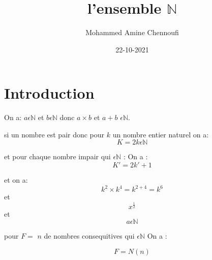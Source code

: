 \documentclass[14pt]{extarticle}
\title{l'ensemble $\mathbb{N}$}
\date{22-10-2021}
\author{Mohammed Amine Chennoufi}
\begin{document}
\maketitle
\newpage
{}
\section{Introduction}
On a: $ a {\epsilon} {\mathbb{N}}$ et $b \epsilon {\mathbb{N}}$
donc $ a \times b $ et $ a+b$ $ \epsilon {\mathbb{N}}$.


si un nombre est pair donc pour $k$ un nombre entier naturel on a: 
$$K=2k \epsilon \mathbb{N}$$


et pour chaque nombre impair qui $\epsilon {\mathbb{N}}$ :
On a : 
$$ K' = 2k'+ 1$$

et on a: $$k^2 \times k^4 = k^{2+4} = k^6$$
et 
$$x^{\frac{1}{2}}$$
et 
$$a \epsilon {\mathbb{N}} $$

pour $F = $ $n$ de nombres consequitives qui $\epsilon \mathbb{N}$ On a : 

$$ F = N(n)$$
\end{document}
